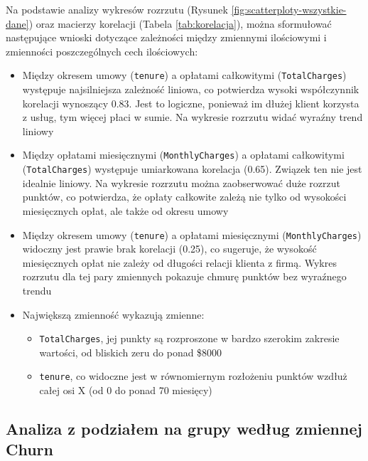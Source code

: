 \documentclass[12pt, a4paper]{article}\usepackage[]{graphicx}\usepackage[]{xcolor}
\begin{document}
\newpage
Na podstawie analizy wykresów rozrzutu (Rysunek \ref{fig:scatterploty-wszystkie-dane}) oraz macierzy korelacji (Tabela \ref{tab:korelacja}), można sformułować następujące wnioski dotyczące zależności między zmiennymi ilościowymi i zmienności poszczególnych cech ilościowych:

\begin{itemize}
  \item Między okresem umowy (\texttt{tenure}) a opłatami całkowitymi (\texttt{TotalCharges}) występuje najsilniejsza zależność liniowa, co potwierdza wysoki współczynnik korelacji wynoszący 0.83. Jest to logiczne, ponieważ im dłużej klient korzysta z usług, tym więcej płaci w sumie. Na wykresie rozrzutu widać wyraźny trend liniowy
    
  \item Między opłatami miesięcznymi (\texttt{MonthlyCharges}) a opłatami całkowitymi (\texttt{TotalCharges}) występuje umiarkowana korelacja (0.65). Związek ten nie jest idealnie liniowy. Na wykresie rozrzutu można zaobserwować duże rozrzut punktów, co potwierdza, że opłaty całkowite zależą nie tylko od wysokości miesięcznych opłat, ale także od okresu umowy
    
  \item Między okresem umowy (\texttt{tenure}) a opłatami miesięcznymi (\texttt{MonthlyCharges}) widoczny jest prawie brak korelacji (0.25), co sugeruje, że wysokość miesięcznych opłat nie zależy od długości relacji klienta z firmą. Wykres rozrzutu dla tej pary zmiennych pokazuje chmurę punktów bez wyraźnego trendu

  \item Największą zmienność wykazują zmienne: 
  \begin{itemize}
      \item \texttt{TotalCharges}, jej punkty są rozproszone w bardzo szerokim zakresie wartości, od bliskich zeru do ponad \$8000
      \item \texttt{tenure}, co widoczne jest w równomiernym rozłożeniu punktów wzdłuż całej osi X (od 0 do ponad 70 miesięcy)
  \end{itemize}
    
\end{itemize}









\newpage
\subsection{Analiza z podziałem na grupy według zmiennej Churn}
\end{document}
